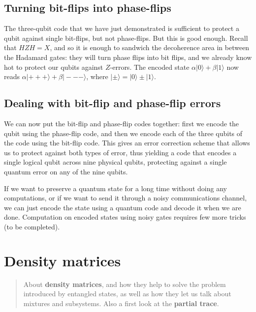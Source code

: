\documentclass[fleqn]{article}
\let\oldsection\section
\renewcommand\section{\clearpage\oldsection}
\begin{document}
\hypertarget{turning-bit-flips-into-phase-flips}{%
\subsection{Turning bit-flips into phase-flips}\label{turning-bit-flips-into-phase-flips}}

The three-qubit code that we have just demonstrated is sufficient to protect a qubit against single bit-flips, but not phase-flips.
But this is good enough.
Recall that \(HZH=X\), and so it is enough to sandwich the decoherence area in between the Hadamard gates: they will turn phase flips into bit flips, and we already know hot to protect our qubits against \(Z\)-errors.
The encoded state \(\alpha|0\rangle + \beta|1\rangle\) now reads \(\alpha|+++\rangle+\beta|---\rangle\), where \(|\pm\rangle=|0\rangle\pm|1\rangle\).

\hypertarget{dealing-with-bit-flip-and-phase-flip-errors}{%
\subsection{Dealing with bit-flip and phase-flip errors}\label{dealing-with-bit-flip-and-phase-flip-errors}}

We can now put the bit-flip and phase-flip codes together: first we encode the qubit using the phase-flip code, and then we encode each of the three qubits of the code using the bit-flip code.
This gives an error correction scheme that allows us to protect against both types of error, thus yielding a code that encodes a single logical qubit across nine physical qubits, protecting against a single quantum error on any of the nine qubits.

If we want to preserve a quantum state for a long time without doing any computations, or if we want to send it through a noisy communications channel, we can just encode the state using a quantum code and decode it when we are done.
Computation on encoded states using noisy gates requires few more tricks (to be completed).

\hypertarget{chapter9}{%
\section{Density matrices}\label{chapter9}}

\begin{quote}
About \textbf{density matrices}, and how they help to solve the problem introduced by entangled states, as well as how they let us talk about mixtures and subsystems.
Also a first look at the \textbf{partial trace}.
\end{quote}
\end{document}

